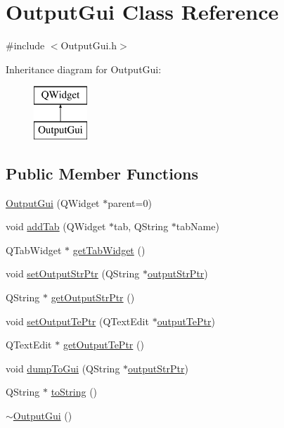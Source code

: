 \hypertarget{class_output_gui}{\section{Output\-Gui Class Reference}
\label{class_output_gui}
}


{\ttfamily \#include $<$Output\-Gui.\-h$>$}

Inheritance diagram for Output\-Gui\-:\begin{figure}[H]
\begin{center}
\leavevmode
\includegraphics[height=2.000000cm]{class_output_gui}
\end{center}
\end{figure}
\subsection*{Public Member Functions}
\begin{DoxyCompactItemize}
\item 
\hyperlink{class_output_gui_a6442997196cceca74c0a79ddb9763d2c}{Output\-Gui} (Q\-Widget $\ast$parent=0)
\item 
void \hyperlink{class_output_gui_ad28c34939968c81bdba5e7edcd94fde2}{add\-Tab} (Q\-Widget $\ast$tab, Q\-String $\ast$tab\-Name)
\item 
Q\-Tab\-Widget $\ast$ \hyperlink{class_output_gui_acd5d7658edaa37f392fbb2524cb5cd05}{get\-Tab\-Widget} ()
\item 
void \hyperlink{class_output_gui_a687667915693352adb03e70308cfd5a7}{set\-Output\-Str\-Ptr} (Q\-String $\ast$\hyperlink{class_output_gui_acea305d3550516efa01d04ac26e7cdfe}{output\-Str\-Ptr})
\item 
Q\-String $\ast$ \hyperlink{class_output_gui_ad4abdae16610fff4f63093ee4bda1689}{get\-Output\-Str\-Ptr} ()
\item 
void \hyperlink{class_output_gui_acec501555b0a0ab37d25c86c699c5a10}{set\-Output\-Te\-Ptr} (Q\-Text\-Edit $\ast$\hyperlink{class_output_gui_affbe7d587f4f755b67cae654f5e468d8}{output\-Te\-Ptr})
\item 
Q\-Text\-Edit $\ast$ \hyperlink{class_output_gui_a00408b170ed757b3aaec0215575f4206}{get\-Output\-Te\-Ptr} ()
\item 
void \hyperlink{class_output_gui_aab81451130a0b2006fbc5093368c56bb}{dump\-To\-Gui} (Q\-String $\ast$\hyperlink{class_output_gui_acea305d3550516efa01d04ac26e7cdfe}{output\-Str\-Ptr})
\item 
Q\-String $\ast$ \hyperlink{class_output_gui_a54a7652249e8ea5f039e933012e1df73}{to\-String} ()
\item 
\hyperlink{class_output_gui_a5b18318b0cf8ebb4118ce9197f80ea49}{$\sim$\-Output\-Gui} ()
\end{DoxyCompactItemize}
